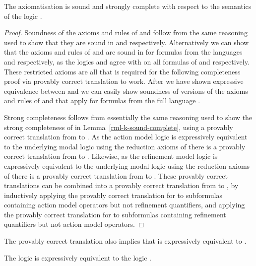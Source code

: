 \begin{theorem}\label{raml-k-sound-complete}
The axiomatisation \axiomRamlK{} is sound and strongly complete with respect to the semantics of the logic \logicRamlK{}.
\end{theorem}

\begin{proof}[Proof]
Soundness of the axioms and rules of \axiomAmlK{} and \axiomRmlK{} follow from the same reasoning used to show that they are sound in \logicAmlK{} and \logicRmlK{} respectively.
Alternatively we can show that the axioms and rules of \axiomAmlK{} and \axiomRmlK{} are sound in \logicRamlK{} for formulas from the languages \langAml{} and \langRml{} respectively, as the logics \logicAmlK{} and \logicRmlK{} agree with \logicRamlK{} on all formulas of \langAml{} and \langRml{} respectively.
These restricted axioms are all that is required for the following completeness proof via provably correct translation to work.
After we have shown expressive equivalence between \logicRamlK{} and \logicK{} we can easily show soundness of versions of the axioms and rules of \axiomAmlK{} and \axiomRmlK{} that apply for formulas from the full language \langAaml{}. 

Strong completeness follows from essentially the same reasoning used to show the strong completeness of \axiomRmlK{} in Lemma~\ref{rml-k-sound-complete}, using a provably correct translation from \langAaml{} to \langMl{}.
As the action model logic \logicAmlK{} is expressively equivalent to the underlying modal logic \logicK{} using the reduction axioms of \axiomAmlK{} there is a provably correct translation from \langAml{} to \langMl{}.
Likewise, as the refinement model logic \logicRmlK{} is expressively equivalent to the underlying modal logic \logicK{} using the reduction axioms of \axiomRmlK{} there is a provably correct translation from \langRml{} to \langMl{}.
These provably correct translations can be combined into a provably correct translation from \langAaml{} to \langMl{}, by inductively applying the provably correct translation for \logicAmlK{} to subformulas containing action model operators but not refinement quantifiers, and applying the provably correct translation for \logicRmlK{} to subformulas containing refinement quantifiers but not action model operators.
\end{proof}

The provably correct translation also implies that \logicRamlK{} is expressively equivalent to \logicK{}.

\begin{corollary}\label{raml-k-expressive-equivalence}
The logic \logicRamlK{} is expressively equivalent to the logic \logicK{}.
\end{corollary}

